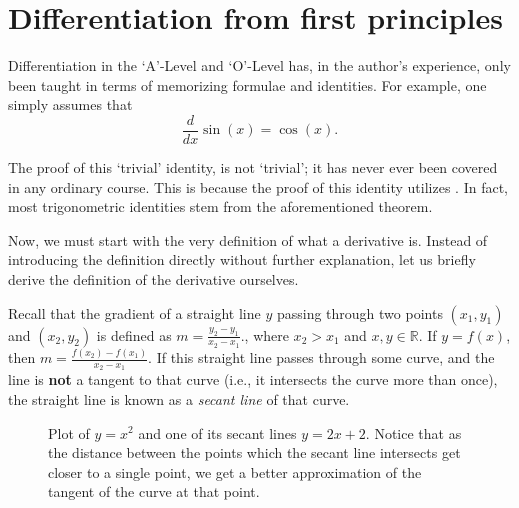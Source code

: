 \section{Differentiation from first principles}
Differentiation in the `A'-Level and `O'-Level has, in the author's experience, only been taught in terms of
memorizing formulae and identities. For example, one simply assumes that \[\frac{d}{dx}\sin(x) = \cos(x).\]

The proof of this `trivial' identity, is not `trivial'; it has never ever been covered in any
ordinary course. This is because the proof of this identity utilizes .
In fact, most trigonometric identities stem from the aforementioned theorem.

Now, we must start with the very definition of what a
derivative is. Instead of introducing the definition directly without further explanation, let us
briefly derive the definition of the derivative ourselves.

Recall that the gradient of a straight line $y$ passing through two points $(x_1, y_1)$ and $(x_2, y_2)$ is
defined as $m = \frac{y_2 - y_1}{x_2 - x_1}.$, where $x_2 > x_1$ and $x,y \in \mathbb{R}$.
If $y = f(x)$, then $m = \frac{f(x_2) - f(x_1)}{x_2 - x_1}.$ If this straight line passes through some curve,
and the line is \textbf{not} a tangent to that curve (i.e., it intersects the curve more than once),
the straight line is known as a \textit{secant line} of that curve.

\begin{figure}[h]
    \centering
    \caption{
        Plot of $y = x^2$ and one of its secant lines $y = 2x + 2$.
        Notice that as the distance between the points which the secant line intersects get closer
        to a single point, we get a better approximation of the tangent of the curve at that point.
    }
    \label{fig:secantline}
\end{figure}

